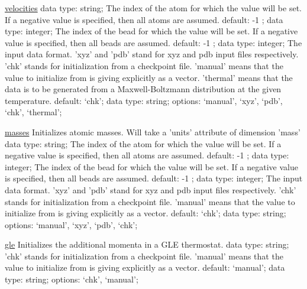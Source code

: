 \begin{ipifield}{}
\begin{ipifield}{\hyperref[INITVELOCITIES]{velocities}}
{data type: string; }%
{%
{The index of the atom for which the value will be set. If a negative value is specified, then all atoms are assumed.}%
{default:  -1 ; data type: integer; }%
%
{The index of the bead for which the value will be set. If a negative value is specified, then all beads are assumed.}%
{default:  -1 ; data type: integer; }%
%
{The input data format. 'xyz' and 'pdb' stand for xyz and pdb input files respectively. 'chk' stands for initialization from a checkpoint file. 'manual' means that the value to initialize from is giving explicitly as a vector. 'thermal' means that the data is to be generated from a Maxwell-Boltzmann distribution at the given temperature.}%
{default: `chk'; data type: string; options: `manual', `xyz', `pdb', `chk', `thermal'; }%
}
\end{ipifield}
\begin{ipifield}{\hyperref[INITMASSES]{masses}}%
{Initializes atomic masses. Will take a 'units' attribute of dimension 'mass'}%
{data type: string; }%
{%
{The index of the atom for which the value will be set. If a negative value is specified, then all atoms are assumed.}%
{default:  -1 ; data type: integer; }%
%
{The index of the bead for which the value will be set. If a negative value is specified, then all beads are assumed.}%
{default:  -1 ; data type: integer; }%
%
{The input data format. 'xyz' and 'pdb' stand for xyz and pdb input files respectively. 'chk' stands for initialization from a checkpoint file. 'manual' means that the value to initialize from is giving explicitly as a vector.}%
{default: `chk'; data type: string; options: `manual', `xyz', `pdb', `chk'; }%
}
\end{ipifield}
\begin{ipifield}{\hyperref[INITTHERMO]{gle}}%
{Initializes the additional momenta in a GLE thermostat.}%
{data type: string; }%
{%
{'chk' stands for initialization from a checkpoint file. 'manual' means that the value to initialize from is giving explicitly as a vector.}%
{default: `manual'; data type: string; options: `chk', `manual'; }%
}
\end{ipifield}
\end{ipifield}
